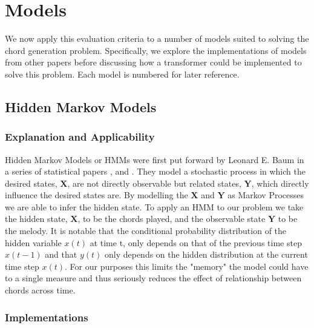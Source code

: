 \section{Models}

We now apply this evaluation criteria to a number of models suited to solving the chord generation problem. 
Specifically, we explore the implementations of models from other papers before discussing how a transformer could be implemented to solve this problem.
Each model is numbered for later reference.

\subsection{Hidden Markov Models}
\label{subsec:HMM}
\subsubsection{Explanation and Applicability}
Hidden Markov Models or HMMs were first put forward by Leonard E. Baum in a series of statistical papers ,  and . 
They model a stochastic process in which the desired states, $\boldsymbol{X}$, are not directly observable but related states, $\boldsymbol{Y}$, which directly influence the desired states are. 
By modelling the $\boldsymbol{X}$ and $\boldsymbol{Y}$ as Markov Processes 
we are able to infer the hidden state.
To apply an HMM to our problem we take the hidden state, $\boldsymbol{X}$, to be the chords played, and the observable state $\boldsymbol{Y}$ to be the melody.
It is notable that the conditional probability distribution of the hidden variable $x(t)$ at time t, only depends on that of the previous time step $x(t-1)$ and that $y(t)$ only depends on the hidden distribution at the current time step $x(t)$.
For our purposes this limits the "memory" the model could have to a single measure and thus seriously reduces the effect of relationship between chords across time.

\subsubsection{Implementations}

